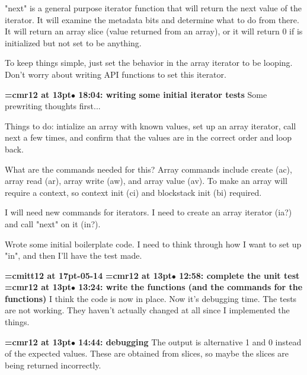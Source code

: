 "next" is a general purpose iterator function that will return the next value of the iterator. It will examine the metadata bits and determine what to do from there. It will return an array slice (value returned from an array), or it will return 0 if is initialized but not set to be anything.
\par

To keep things simple, just set the behavior in the array iterator to be looping. Don't worry about writing API functions to set this iterator.
\par

{\smallskip\noindent\bf\font\titlefont=cmr12 at 13pt\titlefont $\bullet$ 18:04: writing some initial iterator tests}\smallskip
Some prewriting thoughts first...
\par

Things to do: intialize an array with known values, set up an array iterator, call next a few times, and confirm that the values are in the correct order and loop back.
\par

What are the commands needed for this? Array commands include create (ac), array read (ar), array write (aw), and array value (av). To make an array will require a context, so context init (ci) and blockstack init (bi) required.
\par

I will need new commands for iterators. I need to create an array iterator (ia?) and call "next" on it (in?).
\par

Wrote some initial boilerplate code. I need to think through how I want to set up "in", and then I'll have the test made.
\par

{\medskip\noindent\bf\font\titlefont=cmitt12 at 17pt-05-14}\medskip
{\smallskip\noindent\bf\font\titlefont=cmr12 at 13pt\titlefont $\bullet$ 12:58: complete the unit test}\smallskip
{\smallskip\noindent\bf\font\titlefont=cmr12 at 13pt\titlefont $\bullet$ 13:24: write the functions (and the commands for the functions)}\smallskip
I think the code is now in place. Now it's debugging time. The tests are not working. They haven't actually changed at all since I implemented the things.
\par

{\smallskip\noindent\bf\font\titlefont=cmr12 at 13pt\titlefont $\bullet$ 14:44: debugging}\smallskip
The output is alternative 1 and 0 instead of the expected values. These are obtained from slices, so maybe the slices are being returned incorrectly.
\par

